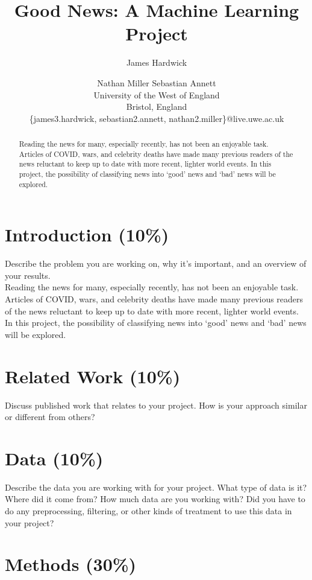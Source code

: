 \documentclass{article}
\title{Good News: A Machine Learning Project}
\author{
James Hardwick\and
Nathan Miller\And
Sebastian Annett\\
\affiliations
University of the West of England\\
Bristol, England\\
\emails
\{james3.hardwick, sebastian2.annett, nathan2.miller\}@live.uwe.ac.uk
}
\begin{document}
\maketitle

\begin{abstract}
    Reading the news for many, especially recently, has not been an enjoyable task. Articles of COVID, wars, and celebrity deaths have made many previous readers of the news reluctant to keep up to date with more recent, lighter world events. In this project, the possibility of classifying news into `good' news and `bad' news will be explored.
\end{abstract}

\section{Introduction (10\%)}

Describe the problem you are working on, why it's important, and an overview of your results.\\

Reading the news for many, especially recently, has not been an enjoyable task. Articles of COVID, wars, and celebrity deaths have made many previous readers of the news reluctant to keep up to date with more recent, lighter world events. In this project, the possibility of classifying news into `good' news and `bad' news will be explored.

\section{Related Work (10\%)}

Discuss published work that relates to your project. How is your approach similar or different from others?

\section{Data (10\%)}

Describe the data you are working with for your project. What type of data is it? Where did it come from? How much data are you working with? Did you have to do any preprocessing, filtering, or other kinds of treatment to use this data in your project?

\section{Methods (30\%)}
\end{document}
